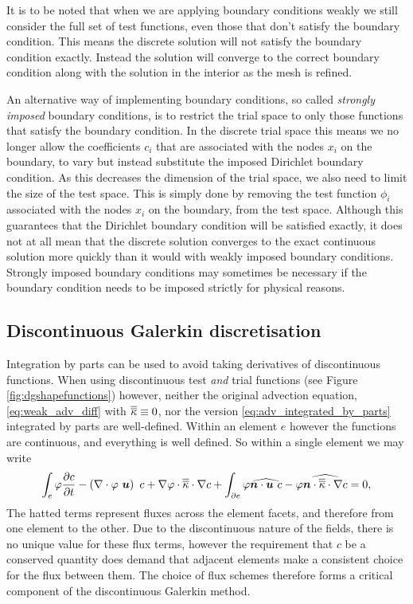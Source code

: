 It is to be noted that when we are applying boundary conditions weakly we
still consider the full set of test functions, even those that don't satisfy
the boundary condition. This means the discrete solution will not satisfy
the boundary condition exactly. Instead the solution will converge to the
correct boundary condition along with the solution in the interior as the mesh
is refined.

 An alternative way of
implementing boundary conditions, so called \emph{strongly imposed} boundary
conditions, is to restrict the trial space to only those functions that
satisfy the boundary condition. In the discrete trial space this means we no
longer allow the coefficients $c_i$ that are associated with the nodes $x_i$
on the boundary, to vary but instead substitute the imposed Dirichlet
boundary condition. As this decreases the dimension of the trial space, we
also need to limit the size of the test space. This is simply done by
removing the test function $\phi_i$ associated with the nodes $x_i$ on the
boundary, from the test space. Although this guarantees that the Dirichlet
boundary condition will be satisfied exactly, it does not at all mean that
the discrete solution converges to the exact continuous solution more
quickly than it would with weakly imposed boundary conditions. Strongly
imposed boundary conditions may sometimes be necessary if the boundary
condition needs to be imposed strictly for physical reasons.

\subsection{Discontinuous Galerkin discretisation}\label{sec:NM_DG_advection}

Integration by parts can be used to avoid taking
derivatives of discontinuous functions.
When using discontinuous test \emph{and} trial functions (see Figure \ref{fig:dgshapefunctions}) however,
neither the original advection equation, \eqref{eq:weak_adv_diff} with $\overline{\overline{\kappa}}\equiv 0$,
nor the version \eqref{eq:adv_integrated_by_parts} integrated by parts are well-defined.
Within an element $e$ however the functions are continuous, and everything is well defined. So within
a single element we may write
\begin{equation}\label{eq:adv_diff_dg}
  \int_e \varphi \frac{\partial c}{\partial t} -
    \left(\nabla\cdot \varphi~{\mbox{\boldmath$u$}}\right)~c +
    \nabla\varphi\cdot\overline{\overline{\kappa}}\cdot\nabla c +
    \int_{\partial e} \varphi\widehat{{\mbox{\boldmath$n$}}\cdot{\mbox{\boldmath$u$}}~c} -
    \varphi\widehat{{\mbox{\boldmath$n$}}\cdot\overline{\overline{\kappa}}\cdot\nabla c}
    = 0,
\end{equation}
The hatted terms represent fluxes across the element facets, and therefore
from one element to the other. Due to the discontinuous nature of the
fields, there is no unique value for these flux terms, however the
requirement that $c$ be a conserved quantity does demand that adjacent
elements make a consistent choice for the flux between them. The choice of flux
schemes therefore forms a critical component of the discontinuous Galerkin
method.

